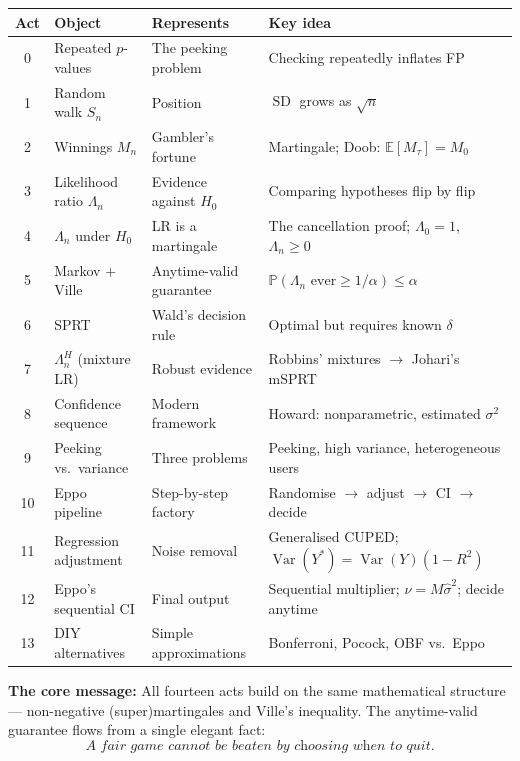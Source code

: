 \documentclass[12pt, a4paper]{article}
\newcommand{\E}{\mathbb{E}}            %
\newcommand{\Prob}{\mathbb{P}}         %
\newcommand{\Var}{\operatorname{Var}}
\newcommand{\SD}{\operatorname{SD}}
\newcommand{\LR}{\Lambda}              %
\begin{document}
\begin{center}
\renewcommand{\arraystretch}{1.3}
\begin{tabular}{@{} c l l p{6.5cm} @{}}
\toprule
\textbf{Act} & \textbf{Object} & \textbf{Represents} & \textbf{Key idea} \\
\midrule
0 & Repeated $p$-values
  & The peeking problem
  & Checking repeatedly inflates FP \\
1 & Random walk $S_n$
  & Position
  & $\SD$ grows as $\sqrt{n}$ \\
2 & Winnings $M_n$
  & Gambler's fortune
  & Martingale; Doob: $\E[M_\tau]=M_0$ \\
3 & Likelihood ratio $\LR_n$
  & Evidence against $H_0$
  & Comparing hypotheses flip by flip \\
4 & $\LR_n$ under $H_0$
  & LR is a martingale
  & The cancellation proof; $\LR_0{=}1$, $\LR_n{\geq}0$ \\
5 & Markov $+$ Ville
  & Anytime-valid guarantee
  & $\Prob(\LR_n \text{ ever}{\geq}1/\alpha)\leq\alpha$ \\
6 & SPRT
  & Wald's decision rule
  & Optimal but requires known $\delta$ \\
7 & $\LR_n^{H}$ (mixture LR)
  & Robust evidence
  & Robbins' mixtures $\to$ Johari's mSPRT \\
8 & Confidence sequence
  & Modern framework
  & Howard: nonparametric, estimated $\sigma^2$ \\
9 & Peeking vs.\ variance
  & Three problems
  & Peeking, high variance, heterogeneous users \\
10 & Eppo pipeline
  & Step-by-step factory
  & Randomise $\to$ adjust $\to$ CI $\to$ decide \\
11 & Regression adjustment
  & Noise removal
  & Generalised CUPED; $\Var(Y^*)=\Var(Y)(1-R^2)$ \\
12 & Eppo's sequential CI
  & Final output
  & Sequential multiplier; $\nu=M\hat{\sigma}^2$; decide anytime \\
13 & DIY alternatives
  & Simple approximations
  & Bonferroni, Pocock, OBF vs.\ Eppo \\
\bottomrule
\end{tabular}
\end{center}

\bigskip
\textbf{The core message:} All fourteen acts build on the same mathematical
structure --- non-negative (super)martingales and Ville's inequality.  The
anytime-valid guarantee flows from a single elegant fact:
\[
  \textit{A fair game cannot be beaten by choosing when to quit.}
\]
\end{document}
